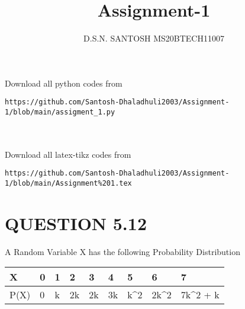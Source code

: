 \documentclass[l1pt,a4paper,two column]{article}
\title{Assignment-1}
\author{D.S.N. SANTOSH MS20BTECH11007}
\date{}
\begin{document}
\maketitle

Download all python codes from 
\\
\begin{lstlisting}
https://github.com/Santosh-Dhaladhuli2003/Assignment-1/blob/main/assigment_1.py
\end{lstlisting}
%
%
\\
\\
Download all latex-tikz codes from 
%
\\
\begin{lstlisting}
https://github.com/Santosh-Dhaladhuli2003/Assignment-1/blob/main/Assignment%201.tex
\end{lstlisting}
   



\section{QUESTION 5.12}
A Random Variable X has the following Probability Distribution \\
\begin{table}[h]
\begin{tabular}{|l|l|l|l|l|l|l|l|l|}

\hline
X    & 0 & 1 & 2  & 3  & 4  & 5   & 6  & 7                     \\ \hline    
P(X) & 0 & k & 2k & 2k & 3k & k^2 & 2k^2 & 7k^2 + k \\ 
\hline

\end{tabular}
\end{table}
\end{document}
